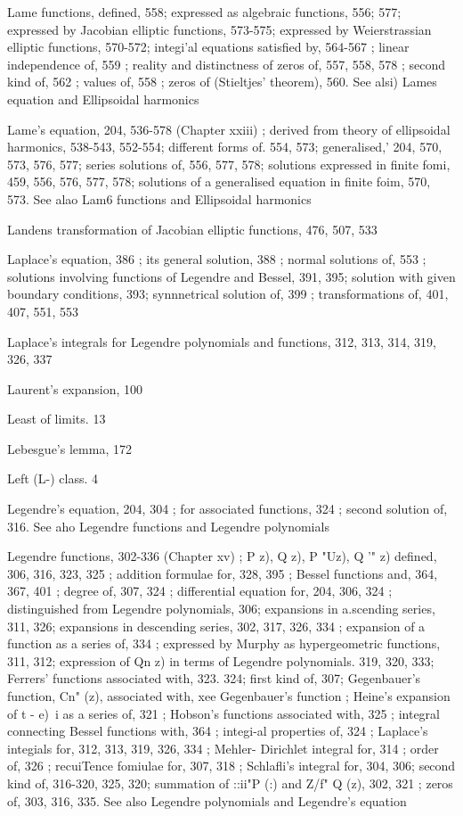 Lame functions, defined, 558; expressed as algebraic functions, 556; 577; expressed by Jacobian
elliptic functions, 573-575; expressed by Weierstrassian elliptic functions, 570-572; integi'al
equations satisfied by, 564-567 ; linear independence of, 559 ; reality and distinctness of
zeros of, 557, 558, 578 ; second kind of, 562 ; values of, 558 ; zeros of (Stieltjes' theorem),
560. See alsi) Lames equation and Ellipsoidal harmonics

Lame's equation, 204, 536-578 (Chapter xxiii) ; derived from theory of ellipsoidal harmonics,
538-543, 552-554; different forms of. 554, 573; generalised,' 204, 570, 573, 576, 577;
series solutions of, 556, 577, 578; solutions expressed in finite fomi, 459, 556, 576, 577, 578;
solutions of a generalised equation in finite foim, 570, 573. See alao Lam6 functions and
Ellipsoidal harmonics

Landens transformation of Jacobian elliptic functions, 476, 507, 533

Laplace's equation, 386 ; its general solution, 388 ; normal solutions of, 553 ; solutions involving
functions of Legendre and Bessel, 391, 395; solution with given boundary conditions, 393;
synnnetrical solution of, 399 ; transformations of, 401, 407, 551, 553

Laplace's integrals for Legendre polynomials and functions, 312, 313, 314, 319, 326, 337

Laurent's expansion, 100

Least of limits. 13

Lebesgue's lemma, 172

Left (L-) class. 4

Legendre's equation, 204, 304 ; for associated functions, 324 ; second solution of, 316. See aho
Legendre functions and Legendre polynomials

Legendre functions, 302-336 (Chapter xv) ; P  z), Q  z), P "Uz), Q '" z) defined, 306, 316, 323,
325 ; addition formulae for, 328, 395 ; Bessel functions and, 364, 367, 401 ; degree of, 307,
324 ; differential equation for, 204, 306, 324 ; distinguished from Legendre polynomials,
306; expansions in a.scending series, 311, 326; expansions in descending series, 302, 317,
326, 334 ; expansion of a function as a series of, 334 ; expressed by Murphy as hypergeometric
functions, 311, 312; expression of Qn z) in terms of Legendre polynomials. 319, 320, 333;
Ferrers' functions associated with, 323. 324; first kind of, 307; Gegenbauer's function,
Cn" (z), associated with, xee Gegenbauer's function ; Heine's expansion of  t - e)~i as a series
of, 321 ; Hobson's functions associated with, 325 ; integral connecting Bessel functions with,
364 ; integi-al properties of, 324 ; Laplace's integials for, 312, 313, 319, 326, 334 ; Mehler-
Dirichlet integral for, 314 ; order of, 326 ; recuiTence fomiulae for, 307, 318 ; Schlafli's
integral for, 304, 306; second kind of, 316-320, 325, 320; summation of ::ii"P (:) and
Z/f" Q  (z), 302, 321 ; zeros of, 303, 316, 335. See also Legendre polynomials and Legendre's
equation


